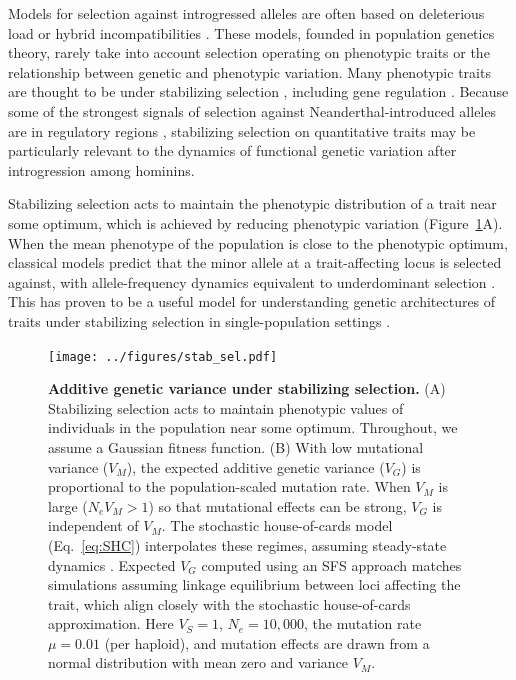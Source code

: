 \documentclass{article}
\newcommand{\moments}{\texttt{moments}\xspace}
\begin{document}
Models for selection against introgressed alleles are often based on
deleterious load or hybrid incompatibilities \citep{muller1942isolating}. These
models, founded in population genetics theory, rarely take into account
selection operating on phenotypic traits or the relationship between genetic
and phenotypic variation.  Many phenotypic traits are thought to be under
stabilizing selection \citep{sanjak2018evidence, sella2019thinking}, including
gene regulation \citep{gilad2006natural, hodgins2015gene, price2022detecting}.
Because some of the strongest signals of selection against
Neanderthal-introduced alleles are in regulatory regions
\citep{sankararaman2014genomic}, stabilizing selection on quantitative traits
may be particularly relevant to the dynamics of functional genetic variation
after introgression among hominins.

Stabilizing selection acts to maintain the phenotypic distribution of a trait
near some optimum, which is achieved by reducing phenotypic variation
(Figure~\ref{fig:stab-sel}A). When the mean phenotype of the population is
close to the phenotypic optimum, classical models predict that the minor allele
at a trait-affecting locus is selected against, with allele-frequency dynamics
equivalent to underdominant selection \citep{robertson1956effect}. This has
proven to be a useful model for understanding genetic architectures of traits
under stabilizing selection in single-population settings
\citep[e.g.,][]{keightley1988quantitative, simons2018population,
hayward2022polygenic}.

\begin{figure}[tb!]
    \centering
    \texttt{[image: ../figures/stab\_sel.pdf]}
    \caption{
        \textbf{Additive genetic variance under stabilizing selection.}
        (A) Stabilizing selection acts to maintain phenotypic values of
        individuals in the population near some optimum. Throughout, we assume
        a Gaussian fitness function.
        (B) With low mutational variance ($V_M$), the expected additive
        genetic variance ($V_G$) is proportional to the
        population-scaled mutation rate. When $V_M$ is large ($N_e V_M > 1$) so that
        mutational effects can be strong, $V_G$ is independent of $V_M$.
        The stochastic house-of-cards model (Eq.~\ref{eq:SHC})
        interpolates these regimes, assuming steady-state dynamics
        \citep{burger1989much}. Expected $V_G$ computed using an SFS approach
        \citep[developed here using \moments,][]{jouganous2017inferring}
        matches simulations assuming linkage equilibrium between loci affecting the
        trait, which align closely with the stochastic house-of-cards
        approximation.
        Here $V_S=1$, $N_e=10{,}000$, the mutation rate
        $\mu=0.01$ (per haploid), and mutation effects are drawn from a normal
        distribution with mean zero and variance $V_M$.
    }
    \label{fig:stab-sel}
\end{figure}
\end{document}
